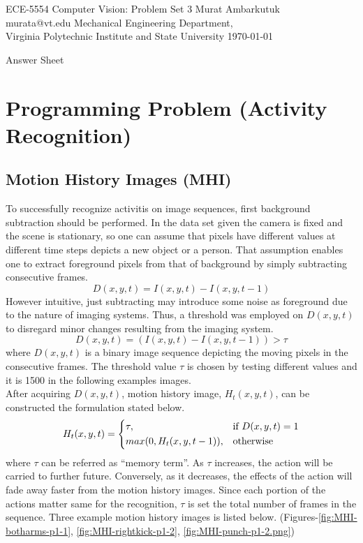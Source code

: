 \documentclass{article}
\begin{document}
\label{Cover}
	\begin{center}
	\large{ECE-5554 Computer Vision: Problem Set 3} 
	\vfill
	Murat Ambarkutuk \\ murata@vt.edu
	\vfill
	Mechanical Engineering Department,\\ Virginia Polytechnic Institute and State University
	\vfill
	\today
	\end{center}
\pagebreak 
\large{Answer Sheet}
\label{Short Answer}

\label{Programming Problem (Activity Recognition)}
\section{Programming Problem (Activity Recognition)}
\subsection{Motion History Images (MHI)}
To successfully recognize activitis on image sequences, first background
subtraction should be performed.
In the data set given the camera is fixed and the scene is stationary, so one
can assume that pixels have different values at different time steps depicts a
new object or a person. That assumption enables one to extract foreground pixels
from that of background by simply subtracting consecutive frames. 
$$D(x,y,t) = I(x,y,t) - I(x,y,t-1)$$
However intuitive, just subtracting may introduce some noise as foreground due
to the nature of imaging systems. Thus, a threshold was employed on $D(x,y,t)$
to disregard minor changes resulting from the imaging system. 
$$D(x,y,t) = (I(x,y,t)-I(x,y,t-1))> \tau$$
where $D(x,y,t)$ is a binary image sequence depicting the moving pixels in the
consecutive frames. The threshold value $\tau$ is chosen by testing different
values and it is 1500 in the following examples images. \\
After acquiring $D(x,y,t)$, motion history image, $H_t(x,y,t)$, can be
constructed the formulation stated below.
$$H_t(x,y,t) =
\begin{dcases}
    \tau, & \text{if } D(x,y,t)=1\\
    max(0,H_t(x,y,t-1)),              & \text{otherwise}
\end{dcases}
$$
where $\tau$ can be referred as ``memory term''. As $\tau$ increases, the action
will be carried to further future. Conversely, as it decreases, the effects of
the action will fade away faster from the motion history images. Since each 
portion of the actions matter same for the recognition, $\tau$ is set the total
number of frames in the sequence. Three example motion history images is listed
below. (Figures-\ref{fig:MHI-botharms-p1-1}, \ref{fig:MHI-rightkick-p1-2}, \ref{fig:MHI-punch-p1-2.png})
\end{document}
